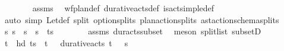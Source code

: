 \begin{isabellebody}
\ \ \ \ \ \ \isamarkupfalse%
\ assms\ \isamarkupfalse%
\ wf{\isacharunderscore}{\kern0pt}plan{\isacharunderscore}{\kern0pt}def\ durative{\isacharunderscore}{\kern0pt}acts{\isacharunderscore}{\kern0pt}def\ is{\isacharunderscore}{\kern0pt}act{\isacharunderscore}{\kern0pt}simple{\isacharunderscore}{\kern0pt}def\isanewline
\ \ \ \ \ \ \isamarkupfalse%
\ {\isacharparenleft}{\kern0pt}auto\ simp{\isacharcolon}{\kern0pt}\ Let{\isacharunderscore}{\kern0pt}def\ split{\isacharcolon}{\kern0pt}\ option{\isachardot}{\kern0pt}splits\ plan{\isacharunderscore}{\kern0pt}action{\isachardot}{\kern0pt}splits\ ast{\isacharunderscore}{\kern0pt}action{\isacharunderscore}{\kern0pt}schema{\isachardot}{\kern0pt}splits{\isacharparenright}{\kern0pt}\isanewline
\ \ \ \ \isamarkupfalse%
\ {\isasympi}s\ {\isasympi}s\ \ {\isachardoublequoteopen}{\isasympi}s\ {\isacharequal}{\kern0pt}\ {\isasympi}s\ {\isacharat}{\kern0pt}\ {\isacharparenleft}{\kern0pt}{\isacharparenleft}{\kern0pt}t\isactrlsub {\isasympi}{\isacharcomma}{\kern0pt}{\isasympi}{\isacharparenright}{\kern0pt}{\isacharhash}{\kern0pt}{\isasympi}s\isanewline
\ \ \ \ \ \ \isamarkupfalse%
\ assms\ dur{\isacharunderscore}{\kern0pt}acts{\isacharunderscore}{\kern0pt}subset\ \isamarkupfalse%
\ {\isacharparenleft}{\kern0pt}meson\ split{\isacharunderscore}{\kern0pt}list\ subsetD{\isacharparenright}{\kern0pt}\ \isanewline
\ \ \ \ \isamarkupfalse%
\ \isamarkupfalse%
\ {\isachardoublequoteopen}{\isacharparenleft}{\kern0pt}t\isactrlsub {\isasympi}{\isacharcomma}{\kern0pt}{\isasympi}{\isacharparenright}{\kern0pt}\ {\isacharequal}{\kern0pt}\ hd\ {\isacharparenleft}{\kern0pt}{\isacharparenleft}{\kern0pt}t\isactrlsub {\isasympi}{\isacharcomma}{\kern0pt}{\isasympi}{\isacharparenright}{\kern0pt}{\isacharhash}{\kern0pt}{\isasympi}s\ \ {\isachardoublequoteopen}{\isacharparenleft}{\kern0pt}t\isactrlsub {\isasympi}{\isacharcomma}{\kern0pt}\ {\isasympi}{\isacharparenright}{\kern0pt}\ {\isasymin}\ durative{\isacharunderscore}{\kern0pt}acts\ {\isacharparenleft}{\kern0pt}{\isacharparenleft}{\kern0pt}t\isactrlsub {\isasympi}{\isacharcomma}{\kern0pt}\ {\isasympi}{\isacharparenright}{\kern0pt}\ {\isacharhash}{\kern0pt}\ {\isasympi}s\isanewline

\end{isabellebody}
